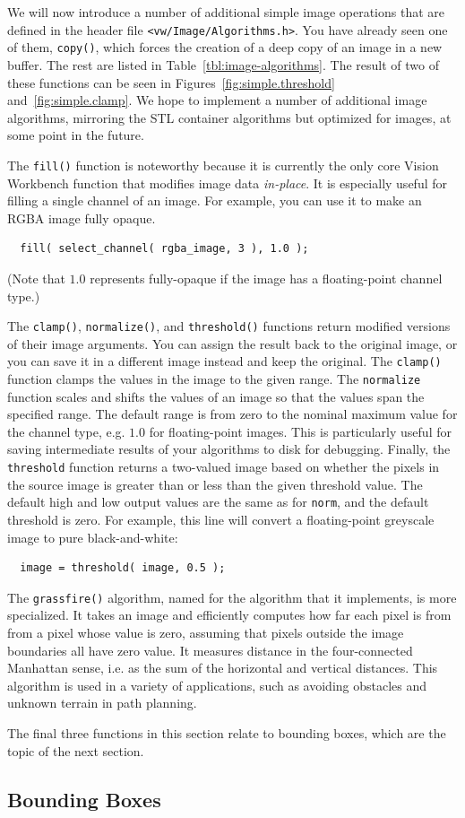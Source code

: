 We will now introduce a number of additional simple image operations
that are defined in the header file \verb#<vw/Image/Algorithms.h>#.
You have already seen one of them, \verb#copy()#, which forces the
creation of a deep copy of an image in a new buffer.  The rest are
listed in Table~\ref{tbl:image-algorithms}.  The result of two of
these functions can be seen in Figures~\ref{fig:simple.threshold}
and~\ref{fig:simple.clamp}.  We hope to implement a number of
additional image algorithms, mirroring the STL container algorithms
but optimized for images, at some point in the future.

The \verb#fill()# function is noteworthy because it is currently the
only core Vision Workbench function that modifies image data {\it
  in-place}.  It is especially useful for filling a single channel of
an image.  For example, you can use it to make an RGBA image fully
opaque.
\begin{verbatim}
  fill( select_channel( rgba_image, 3 ), 1.0 );
\end{verbatim}
(Note that $1.0$ represents fully-opaque if the image has a 
floating-point channel type.)

The \verb#clamp()#, \verb#normalize()#, and \verb#threshold()#
functions return modified versions of their image arguments.
You can assign the result back to the original image, or you can 
save it in a different image instead and keep the original.  
The \verb#clamp()# function clamps the values in the image to 
the given range.  The \verb#normalize# function scales and 
shifts the values of an image so that the values span the 
specified range.  The default range is from zero to the nominal 
maximum value for the channel type, e.g. $1.0$ for floating-point 
images.  This is particularly useful for saving intermediate 
results of your algorithms to disk for debugging.  Finally, the 
\verb#threshold# function returns a two-valued image based on  
whether the pixels in the source image is greater than or less 
than the given threshold value.  The default high and low output 
values are the same as for \verb#norm#, and the default threshold 
is zero.  For example, this line will convert a floating-point 
greyscale image to pure black-and-white:
\begin{verbatim}
  image = threshold( image, 0.5 );
\end{verbatim}

The \verb#grassfire()# algorithm, named for the algorithm that 
it implements, is more specialized.  It takes an image and 
efficiently computes how far each pixel is from from a pixel 
whose value is zero, assuming that pixels outside the image 
boundaries all have zero value.  It measures distance in the 
four-connected Manhattan sense, i.e. as the sum of the 
horizontal and vertical distances.  This algorithm is used in 
a variety of applications, such as avoiding obstacles and 
unknown terrain in path planning.

The final three functions in this section relate to bounding 
boxes, which are the topic of the next section.

\subsection{Bounding Boxes}

